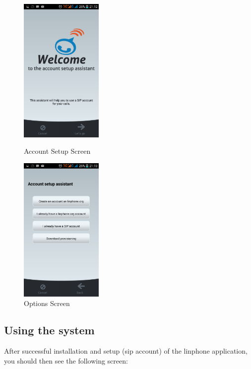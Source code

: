 \documentclass[a4paper]{article}
\begin{document}
\begin{figure}[h]
  \centering
  \begin{minipage}[h]{0.4\textwidth}
    \includegraphics[width=40mm, scale=0.5]{pictures/welcome.png}
    \caption{Account Setup Screen}
  \end{minipage}
  \hfill
  \begin{minipage}[h]{0.4\textwidth}
    \includegraphics[width=40mm, scale=0.5]{pictures/options.png}
    \caption{Options Screen}
  \end{minipage}
\end{figure}


\newpage

\subsection{Using the system}

After successful installation and setup (sip account) of the linphone application, you should then see the following screen:
\end{document}
